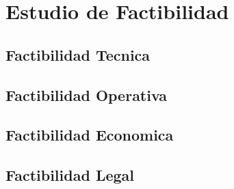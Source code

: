 \chapter{Estudio de Factibilidad}

\section{Factibilidad Tecnica}

\section{Factibilidad Operativa}

\section{Factibilidad Economica}

\section{Factibilidad Legal}


